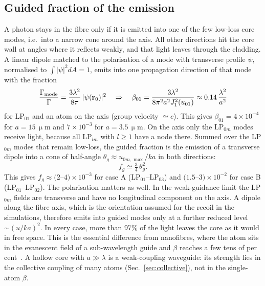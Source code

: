 \documentclass[11pt,a4paper]{article}
\newcommand{\micrometre}{\upmu m}\newcommand{\microkelvin}{\upmu K}
\newcommand{\SI}[2]{\ensuremath{#1\,\mathrm{#2}}}
\begin{document}
\subsection{Guided fraction of the emission}
A photon stays in the fibre only if it is emitted into one of the few low-loss core modes, i.e.\ into a narrow cone around the axis. All other directions hit the core wall at angles where it reflects weakly, and that light leaves through the cladding. A linear dipole matched to the polarisation of a mode with transverse profile $\psi$, normalised to $\int|\psi|^2dA=1$, emits into one propagation direction of that mode with the fraction~\cite{lekien2005}
\begin{equation}
  \frac{\Gamma_{\rm mode}}{\Gamma}=\frac{3\lambda^2}{8\pi}\,|\psi(\mathbf r_0)|^2
  \quad\Rightarrow\quad
  \beta_{01}=\frac{3\lambda^2}{8\pi^2a^2J_1^2(u_{01})}\approx0.14\,\frac{\lambda^2}{a^2}
  \label{eq:beta01}
\end{equation}
for LP$_{01}$ and an atom on the axis (group velocity $\simeq c$). This gives $\beta_{01}=4\times10^{-4}$ for $a=\SI{15}{\micrometre}$ and $7\times10^{-3}$ for $a=\SI{3.5}{\micrometre}$. On the axis only the LP$_{0m}$ modes receive light, because all LP$_{lm}$ with $l\ge1$ have a node there. Summed over the LP$_{0m}$ modes that remain low-loss, the guided fraction is the emission of a transverse dipole into a cone of half-angle $\theta_g\approx u_{0m,\max}/ka$ in both directions:
\begin{equation}
  f_g\simeq\tfrac34\,\theta_g^2 .
  \label{eq:fg}
\end{equation}
This gives $f_g\approx(2$--$4)\times10^{-3}$ for case A (LP$_{01}$--LP$_{03}$) and $(1.5$--$3)\times10^{-2}$ for case B (LP$_{01}$--LP$_{02}$). The polarisation matters as well. In the weak-guidance limit the LP$_{0m}$ fields are transverse and have no longitudinal component on the axis. A dipole along the fibre axis, which is the orientation assumed for the recoil in the simulations, therefore emits into guided modes only at a further reduced level $\sim(u/ka)^2$. In every case, more than 97\% of the light leaves the core as it would in free space. This is the essential difference from nanofibres, where the atom sits in the evanescent field of a sub-wavelength guide and $\beta$ reaches a few tens of per cent~\cite{lekien2005,chang2018}. A hollow core with $a\gg\lambda$ is a weak-coupling waveguide: its strength lies in the collective coupling of many atoms (Sec.~\ref{sec:collective}), not in the single-atom $\beta$.
\end{document}
